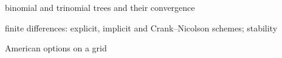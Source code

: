 \begin{planned}
  \item binomial and trinomial trees and their convergence
  \item finite differences: explicit, implicit and Crank--Nicolson schemes; stability
  \item American options on a grid
\end{planned}
